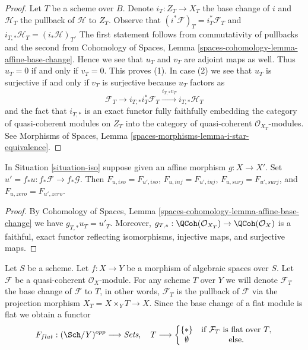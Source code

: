 \begin{proof}
Let $T$ be a scheme over $B$. Denote $i_T : Z_T \to X_T$
the base change of $i$ and $\mathcal{H}_T$ the pullback of $\mathcal{H}$
to $Z_T$. Observe that $(i^*\mathcal{F})_T = i_T^*\mathcal{F}_T$
and $i_{T, *}\mathcal{H}_T = (i_*\mathcal{H})_T$.
The first statement follows from commutativity of pullbacks
and the second from Cohomology of Spaces, Lemma
\ref{spaces-cohomology-lemma-affine-base-change}.
Hence we see that $u_T$ and $v_T$ are adjoint maps as well.
Thus $u_T = 0$ if and only if $v_T = 0$. This proves (1).
In case (2) we see that $u_T$ is surjective if and only if
$v_T$ is surjective because $u_T$ factors as
$$
\mathcal{F}_T \to
i_{T, *}i_T^*\mathcal{F}_T \xrightarrow{i_{T, *}v_T} i_{T, *}\mathcal{H}_T
$$
and the fact that $i_{T, *}$ is an exact functor
fully faithfully embedding the category of quasi-coherent modules on
$Z_T$ into the category of quasi-coherent $\mathcal{O}_{X_T}$-modules.
See Morphisms of Spaces, Lemma \ref{spaces-morphisms-lemma-i-star-equivalence}.
\end{proof}

\begin{lemma}
\label{lemma-relate-zero-affine-push}
In Situation \ref{situation-iso} suppose given an affine morphism
$g : X \to X'$. Set $u' = f_*u : f_*\mathcal{F} \to f_*\mathcal{G}$.
Then $F_{u, iso} = F_{u', iso}$, $F_{u, inj} = F_{u', inj}$,
$F_{u, surj} = F_{u', surj}$, and $F_{u, zero} = F_{u', zero}$.
\end{lemma}

\begin{proof}
By Cohomology of Spaces, Lemma
\ref{spaces-cohomology-lemma-affine-base-change}
we have $g_{T, *}u_T = u'_T$.
Moreover, $g_{T, *} : \QCoh(\mathcal{O}_{X_T}) \to \QCoh(\mathcal{O}_X)$
is a faithful, exact functor reflecting isomorphisms, injective maps,
and surjective maps.
\end{proof}

\begin{situation}
\label{situation-flat}
Let $S$ be a scheme.
Let $f : X \to Y$ be a morphism of algebraic spaces over $S$.
Let $\mathcal{F}$ be a quasi-coherent $\mathcal{O}_X$-module.
For any scheme $T$ over $Y$ we will denote $\mathcal{F}_T$ the
base change of $\mathcal{F}$ to $T$, in other words, $\mathcal{F}_T$
is the pullback of $\mathcal{F}$ via the projection morphism
$X_T = X \times_Y T \to X$. Since the base change of a flat module
is flat we obtain a functor
\begin{equation}
\label{equation-flat}
F_{flat} : (\Sch/Y)^{opp} \longrightarrow \textit{Sets}, \quad
T \longrightarrow \left\{
\begin{matrix}
\{*\} & \text{if } \mathcal{F}_T \text{ is flat over }T, \\
\emptyset & \text{else.}
\end{matrix}
\right.
\end{equation}
\end{situation}

